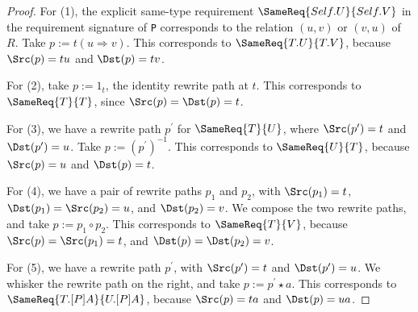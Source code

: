 \documentclass[../generics]{subfiles}
\begin{document}
\begin{proof}
For (1), the explicit same-type requirement $\SameReq{Self.U}{Self.V}$ in the requirement signature of \texttt{P} corresponds to the relation $(u, v)$ or $(v, u)$ of $R$. Take $p:=t(u\Rightarrow v)$. This corresponds to $\SameReq{T.U}{T.V}$, because $\Src(p)=tu$ and $\Dst(p)=tv$.

For (2), take $p:=1_t$, the identity rewrite path at $t$. This corresponds to $\SameReq{T}{T}$, since $\Src(p)=\Dst(p)=t$.

For (3), we have a rewrite path $p^\prime$ for $\SameReq{T}{U}$, where $\Src(p^\prime)=t$ and $\Dst(p^\prime)=u$. Take $p := (p^\prime)^{-1}$. This corresponds to $\SameReq{U}{T}$, because $\Src(p)=u$ and $\Dst(p)=t$.

For (4), we have a pair of rewrite paths $p_1$ and $p_2$, with $\Src(p_1)=t$, $\Dst(p_1)=\Src(p_2)=u$, and $\Dst(p_2)=v$. We compose the two rewrite paths, and take $p:=p_1\circ p_2$. This corresponds to $\SameReq{T}{V}$, because $\Src(p)=\Src(p_1)=t$, and $\Dst(p)=\Dst(p_2)=v$.

For (5), we have a rewrite path $p^\prime$, with $\Src(p^\prime)=t$ and $\Dst(p^\prime)=u$. We whisker the rewrite path on the right, and take $p:=p^\prime\star a$. This corresponds to $\SameReq{T.[P]A}{U.[P]A}$, because $\Src(p)=ta$ and $\Dst(p)=ua$.
\end{proof}
\end{document}
